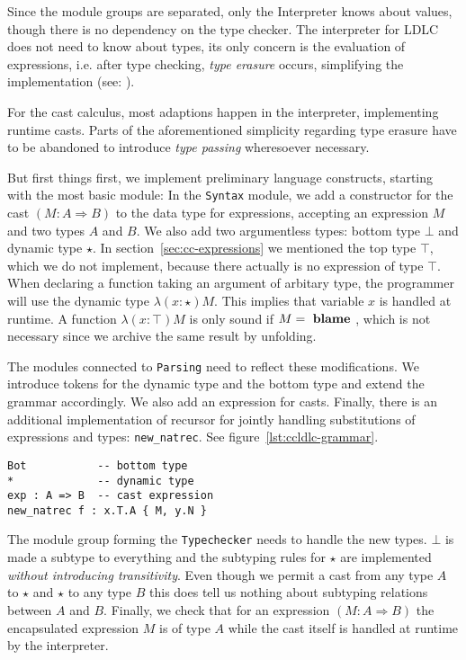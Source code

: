 Since the module groups are separated, only the Interpreter knows about values, though there is no dependency on the type checker. The interpreter for LDLC does not need to know about types, its only concern is the evaluation of expressions, i.e. after type checking, \emph{type erasure} occurs, simplifying the implementation (see: \cite{crary2002}).

For the cast calculus, most adaptions happen in the interpreter, implementing runtime casts. Parts of the aforementioned simplicity regarding type erasure have to be abandoned to introduce \emph{type passing} wheresoever necessary.

But first things first, we implement preliminary language constructs, starting with the most basic module: In the \texttt{Syntax} module, we add a constructor for the cast $(M : A \Rightarrow B)$ to the data type for expressions, accepting an expression $M$ and two types $A$ and $B$. We also add two argumentless types: bottom type $\bot$ and dynamic type $\star$. In section~\ref{sec:cc-expressions} we mentioned the top type $\top$, which we do not implement, because there actually is no expression of type $\top$. When declaring a function taking an argument of arbitary type, the programmer will use the dynamic type $\lambda(x:\star)M$. This implies that variable $x$ is handled at runtime. A function $\lambda(x:\top)M$ is only sound if $M = \text{ \textbf{blame} }$, which is not necessary since we archive the same result by unfolding.

The modules connected to \texttt{Parsing} need to reflect these modifications. We introduce tokens for the dynamic type and the bottom type and extend the grammar accordingly. We also add an expression for casts. Finally, there is an additional implementation of recursor \rec for jointly handling substitutions of expressions and types: \texttt{new\_natrec}. See figure~\ref{lst:ccldlc-grammar}.

\begin{lstlisting}[float,language=ldgv,
  caption=New language constructs for CCLDLC,
  label=lst:ccldlc-grammar]
Bot           -- bottom type
*             -- dynamic type
exp : A => B  -- cast expression
new_natrec f : x.T.A { M, y.N }
\end{lstlisting}

The module group forming the \texttt{Typechecker} needs to handle the new types. $\bot$ is made a subtype to everything and the subtyping rules for $\star$ are implemented \emph{without introducing transitivity}. Even though we permit a cast from any type $A$ to $\star$ and $\star$ to any type $B$ this does tell us nothing about subtyping relations between $A$ and $B$. Finally, we check that for an expression $(M : A \Rightarrow B)$ the encapsulated expression $M$ is of type $A$ while the cast itself is handled at runtime by the interpreter.

